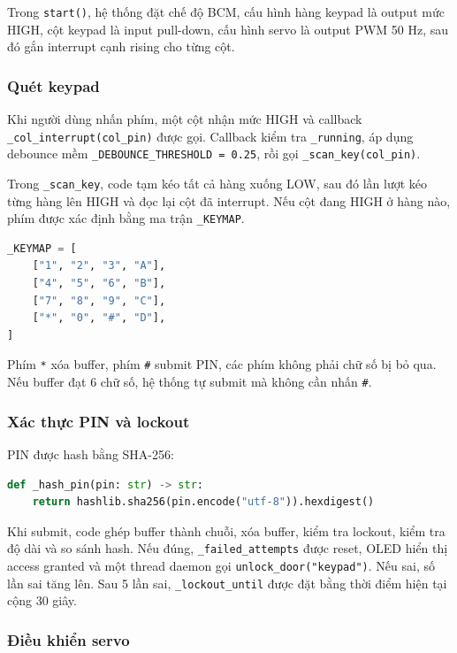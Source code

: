Trong \texttt{start()}, hệ thống đặt chế độ BCM, cấu hình hàng keypad là output mức HIGH, cột keypad là input pull-down, cấu hình servo là output PWM 50 Hz, sau đó gắn interrupt cạnh rising cho từng cột.

\subsubsection{Quét keypad}

Khi người dùng nhấn phím, một cột nhận mức HIGH và callback \texttt{\_col\_interrupt(col\_pin)} được gọi. Callback kiểm tra \texttt{\_running}, áp dụng debounce mềm \texttt{\_DEBOUNCE\_THRESHOLD = 0.25}, rồi gọi \texttt{\_scan\_key(col\_pin)}.

Trong \texttt{\_scan\_key}, code tạm kéo tất cả hàng xuống LOW, sau đó lần lượt kéo từng hàng lên HIGH và đọc lại cột đã interrupt. Nếu cột đang HIGH ở hàng nào, phím được xác định bằng ma trận \texttt{\_KEYMAP}.

\begin{lstlisting}[language=Python, caption={Keymap của keypad 4x4}]
_KEYMAP = [
    ["1", "2", "3", "A"],
    ["4", "5", "6", "B"],
    ["7", "8", "9", "C"],
    ["*", "0", "#", "D"],
]
\end{lstlisting}

Phím \texttt{*} xóa buffer, phím \texttt{\#} submit PIN, các phím không phải chữ số bị bỏ qua. Nếu buffer đạt 6 chữ số, hệ thống tự submit mà không cần nhấn \texttt{\#}.

\subsubsection{Xác thực PIN và lockout}

PIN được hash bằng SHA-256:

\begin{lstlisting}[language=Python, caption={Hàm hash PIN}]
def _hash_pin(pin: str) -> str:
    return hashlib.sha256(pin.encode("utf-8")).hexdigest()
\end{lstlisting}

Khi submit, code ghép buffer thành chuỗi, xóa buffer, kiểm tra lockout, kiểm tra độ dài và so sánh hash. Nếu đúng, \texttt{\_failed\_attempts} được reset, OLED hiển thị access granted và một thread daemon gọi \texttt{unlock\_door("keypad")}. Nếu sai, số lần sai tăng lên. Sau 5 lần sai, \texttt{\_lockout\_until} được đặt bằng thời điểm hiện tại cộng 30 giây.

\subsubsection{Điều khiển servo}

